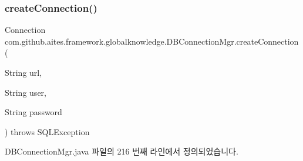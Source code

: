 \subsubsection{\texorpdfstring{create\+Connection()}{createConnection()}\hspace{0.1cm}{\footnotesize\ttfamily [2/2]}}
{\footnotesize\ttfamily Connection com.\+github.\+aites.\+framework.\+globalknowledge.\+D\+B\+Connection\+Mgr.\+create\+Connection (\begin{DoxyParamCaption}\item[{String}]{url,  }\item[{String}]{user,  }\item[{String}]{password }\end{DoxyParamCaption}) throws S\+Q\+L\+Exception\hspace{0.3cm}{\ttfamily [private]}}



D\+B\+Connection\+Mgr.\+java 파일의 216 번째 라인에서 정의되었습니다.


